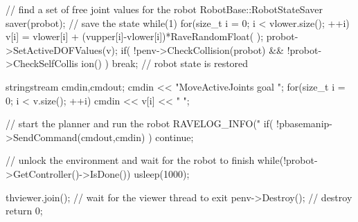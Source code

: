 \begin{DoxyCodeInclude}
{{{            // find a set of free joint values for the robot
            {
                RobotBase::RobotStateSaver saver(probot); // save the state
                while(1) {
                    for(size_t i = 0; i < vlower.size(); ++i) {
                        v[i] = vlower[i] + (vupper[i]-vlower[i])*RaveRandomFloat(
      );
                    }
                    probot->SetActiveDOFValues(v);
                    if( !penv->CheckCollision(probot) && !probot->CheckSelfCollis
      ion() ) {
                        break;
                    }
                }
                // robot state is restored
            }

            stringstream cmdin,cmdout;
            cmdin << "MoveActiveJoints goal ";
            for(size_t i = 0; i < v.size(); ++i) {
                cmdin << v[i] << " ";
            }

            // start the planner and run the robot
            RAVELOG_INFO("%
            if( !pbasemanip->SendCommand(cmdout,cmdin) ) {
                continue;
            }
        }

        // unlock the environment and wait for the robot to finish
        while(!probot->GetController()->IsDone()) {
            usleep(1000);
        }
    }

    thviewer.join(); // wait for the viewer thread to exit
    penv->Destroy(); // destroy
    return 0;
}
\end{DoxyCodeInclude}
 